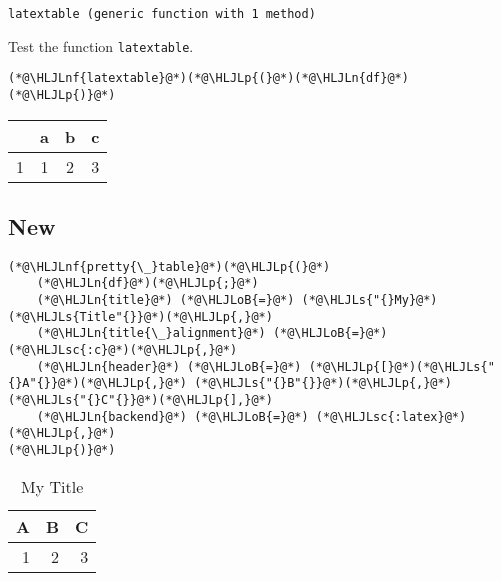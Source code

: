 \documentclass[12pt,a4paper]{article}
\newcommand{\HLJLn}[1]{#1}
\newcommand{\HLJLnf}[1]{\textcolor[RGB]{66,102,213}{#1}}
\newcommand{\HLJLs}[1]{\textcolor[RGB]{201,61,57}{#1}}
\newcommand{\HLJLsc}[1]{\textcolor[RGB]{201,61,57}{#1}}
\newcommand{\HLJLoB}[1]{\textcolor[RGB]{102,102,102}{\textbf{#1}}}
\newcommand{\HLJLp}[1]{#1}
\begin{document}
\begin{lstlisting}
latextable (generic function with 1 method)
\end{lstlisting}


Test the function \texttt{latextable}.


\begin{lstlisting}
(*@\HLJLnf{latextable}@*)(*@\HLJLp{(}@*)(*@\HLJLn{df}@*)(*@\HLJLp{)}@*)
\end{lstlisting}

\begin{tabular}{r|ccc}
	& a & b & c\\
	\hline
	1 & 1 & 2 & 3 \\
\end{tabular}


\subsection{New}

\begin{lstlisting}
(*@\HLJLnf{pretty{\_}table}@*)(*@\HLJLp{(}@*)
    (*@\HLJLn{df}@*)(*@\HLJLp{;}@*)
    (*@\HLJLn{title}@*) (*@\HLJLoB{=}@*) (*@\HLJLs{"{}My}@*) (*@\HLJLs{Title"{}}@*)(*@\HLJLp{,}@*)
    (*@\HLJLn{title{\_}alignment}@*) (*@\HLJLoB{=}@*) (*@\HLJLsc{:c}@*)(*@\HLJLp{,}@*)
    (*@\HLJLn{header}@*) (*@\HLJLoB{=}@*) (*@\HLJLp{[}@*)(*@\HLJLs{"{}A"{}}@*)(*@\HLJLp{,}@*) (*@\HLJLs{"{}B"{}}@*)(*@\HLJLp{,}@*) (*@\HLJLs{"{}C"{}}@*)(*@\HLJLp{],}@*)
    (*@\HLJLn{backend}@*) (*@\HLJLoB{=}@*) (*@\HLJLsc{:latex}@*)(*@\HLJLp{,}@*)
(*@\HLJLp{)}@*)
\end{lstlisting}

\begin{table}
  \caption{My Title}
  \begin{tabular}{rrr}
    \hline\hline
    \textbf{A} & \textbf{B} & \textbf{C} \\\hline
    1 & 2 & 3 \\\hline\hline
  \end{tabular}
\end{table}
\end{document}

